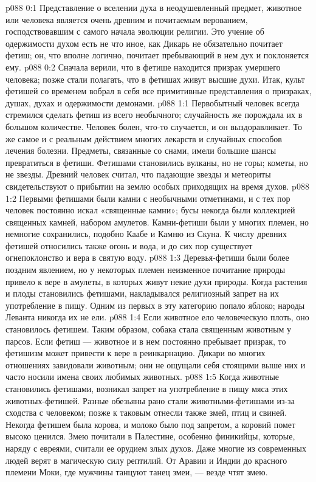 \author{Блестящая Вечерняя Звезда}
\vs p088 0:1 Представление о вселении духа в неодушевленный предмет, животное или человека является очень древним и почитаемым верованием, господствовавшим с самого начала эволюции религии. Это учение об одержимости духом есть не что иное, как  Дикарь не обязательно почитает фетиш; он, что вполне логично, почитает пребывающий в нем дух и поклоняется ему.
\vs p088 0:2 Сначала верили, что в фетише находится призрак умершего человека; позже стали полагать, что в фетишах живут высшие духи. Итак, культ фетишей со временем вобрал в себя все примитивные представления о призраках, душах, духах и одержимости демонами.
\vs p088 1:1 Первобытный человек всегда стремился сделать фетиш из всего необычного; случайность же порождала их в большом количестве. Человек болен, что\hyp{}то случается, и он выздоравливает. То же самое и с реальным действием многих лекарств и случайных способов лечения болезни. Предметы, связанные со снами, имели большие шансы превратиться в фетиши. Фетишами становились вулканы, но не горы; кометы, но не звезды. Древний человек считал, что падающие звезды и метеориты свидетельствуют о прибытии на землю особых приходящих на время духов.
\vs p088 1:2 Первыми фетишами были камни с необычными отметинами, и с тех пор человек постоянно искал «священные камни»; бусы некогда были коллекцией священных камней, набором амулетов. Камни\hyp{}фетиши были у многих племен, но немногие сохранились, подобно Каабе и Камню из Скуна. К числу древних фетишей относились также огонь и вода, и до сих пор существует огнепоклонство и вера в святую воду.
\vs p088 1:3 Деревья\hyp{}фетиши были более поздним явлением, но у некоторых племен неизменное почитание природы привело к вере в амулеты, в которых живут некие духи природы. Когда растения и плоды становились фетишами, накладывался религиозный запрет на их употребление в пищу. Одним из первых в эту категорию попало яблоко; народы Леванта никогда их не ели.
\vs p088 1:4 Если животное ело человеческую плоть, оно становилось фетишем. Таким образом, собака стала священным животным у парсов. Если фетиш --- животное и в нем постоянно пребывает призрак, то фетишизм может привести к вере в реинкарнацию. Дикари во многих отношениях завидовали животным; они не ощущали себя стоящими выше них и часто носили имена своих любимых животных.
\vs p088 1:5 Когда животные становились фетишами, возникал запрет на употребление в пищу мяса этих животных\hyp{}фетишей. Разные обезьяны рано стали животными\hyp{}фетишами из\hyp{}за сходства с человеком; позже к таковым отнесли также змей, птиц и свиней. Некогда фетишем была корова, и молоко было под запретом, а коровий помет высоко ценился. Змею почитали в Палестине, особенно финикийцы, которые, наряду с евреями, считали ее орудием злых духов. Даже многие из современных людей верят в магическую силу рептилий. От Аравии и Индии до красного племени Моки, где мужчины танцуют танец змеи, --- везде чтят змею.
